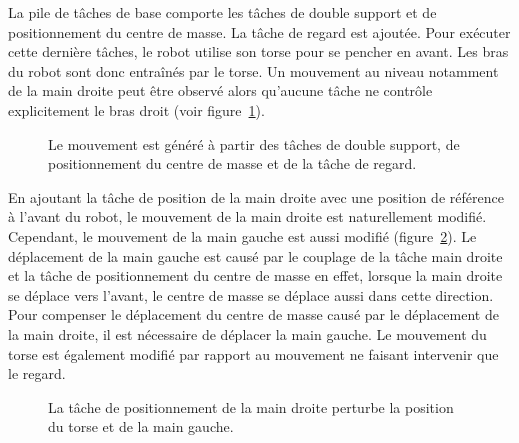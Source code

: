 La pile de t\^aches de base comporte les t\^aches de double support
et de positionnement du centre de masse.
La t\^ache de regard est ajoutée. Pour exécuter 
cette dernière t\^aches, le robot utilise son torse pour se pencher en avant.
Les bras du robot sont donc entraînés par le torse.
Un mouvement au niveau notamment de la main droite
peut être observé alors qu'aucune t\^ache ne contrôle explicitement
le bras droit (voir figure~\ref{fig:gazeCoupling}).
\begin{figure}[t]
  \begin{center}
  \end{center}
  \caption[T\^aches de double support, de centre de masse et de regard.]{Le mouvement est généré à partir des t\^aches de double support,
  de positionnement du centre de masse et de la t\^ache de regard.}
  \label{fig:gazeCoupling}
\end{figure}
En ajoutant la t\^ache de position de la main droite avec une position
de référence à l'avant du robot, le mouvement de la main
droite est naturellement modifié. Cependant, le mouvement de la main gauche est aussi
modifié (figure~\ref{fig:gazeRightArm}). Le déplacement de la main gauche 
est causé par le couplage de la t\^ache main droite
et la t\^ache de positionnement du centre de masse en effet, lorsque la main droite
se déplace vers l'avant, le centre de masse se déplace aussi dans cette
direction. Pour compenser le déplacement du centre de masse causé par
le déplacement de la main droite, il est nécessaire de déplacer la main gauche.
Le mouvement du torse est également modifié par rapport au mouvement ne faisant intervenir que
le regard.
\begin{figure}[t]
  \begin{center}
  \end{center}
  \caption[Couplage de la main et du torse.]{La t\^ache de positionnement de la main droite perturbe
  la position du torse et de la main gauche.}
  \label{fig:gazeRightArm}
\end{figure}

